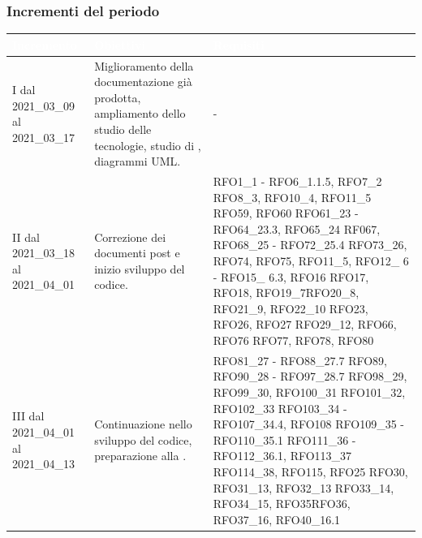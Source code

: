 \subsubsection{Incrementi del periodo}\label{IncrementiPDettaglio}
\begin{table}[H]
	\begin{center}
		\begin{tabular}{ |C{3cm} C{6cm} C{7cm}| }
			\textcolor{white}{\textbf{Incremento}} & \textcolor{white}{\textbf{Obiettivi}} & \textcolor{white}{\textbf{Requisiti}} \\ \hline
			I dal 2021\_03\_09 al 2021\_03\_17& Miglioramento della documentazione già prodotta, ampliamento dello studio delle tecnologie, studio di , diagrammi UML.  & - \\ \hline
			II dal 2021\_03\_18 al 2021\_04\_01 	& Correzione dei documenti post  e inizio sviluppo del codice. &  
			RFO1\_1 - RFO6\_1.1.5, RFO7\_2 \newline
			RFO8\_3, RFO10\_4, RFO11\_5 \newline
			RFO59, RFO60 \newline
			RFO61\_23 - RFO64\_23.3, RFO65\_24 \newline
			RF067, RFO68\_25 - RFO72\_25.4 \newline
			RFO73\_26, RFO74, RFO75, RFO11\_5, \newline 
			RFO12\_ 6 - RFO15\_ 6.3, RFO16 \newline RFO17, RFO18, RFO19\_7\newline RFO20\_8, RFO21\_9, RFO22\_10 \newline RFO23, RFO26, RFO27 \newline RFO29\_12, RFO66, RFO76 \newline RFO77, RFO78, RFO80 \\ \hline
			III dal 2021\_04\_01 al 2021\_04\_13	& Continuazione nello sviluppo del codice, preparazione alla . & RFO81\_27 - RFO88\_27.7 \newline
			RFO89, RFO90\_28 - RFO97\_28.7 \newline
			RFO98\_29, RFO99\_30, RFO100\_31 \newline
			RFO101\_32, RFO102\_33 \newline
			RFO103\_34 - RFO107\_34.4, RFO108 \newline
			RFO109\_35 - RFO110\_35.1\newline
			RFO111\_36 - RFO112\_36.1, RFO113\_37 \newline RFO114\_38, RFO115, RFO25 \newline RFO30, RFO31\_13, RFO32\_13 \newline RFO33\_14, RFO34\_15, RFO35\newline  RFO36, RFO37\_16, RFO40\_16.1 \\ \hline

\end{tabular}
\end{center}
\end{table}
